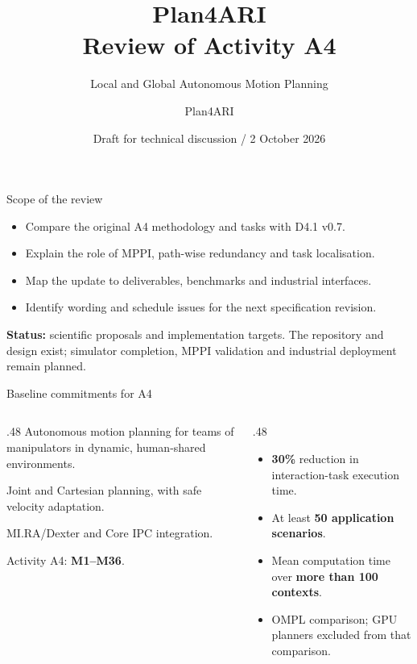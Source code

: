 \documentclass[aspectratio=169,10pt]{beamer}
\title[Plan4ARI / A4 Review]{Plan4ARI\\\large Review of Activity A4}
\subtitle{Local and Global Autonomous Motion Planning}
\author{Plan4ARI}
\institute{Scientific update and proposed technical specification revision}
\date{Draft for technical discussion / 2 October 2026}
\begin{document}
\begin{frame}
\titlepage
\end{frame}

\begin{frame}{Scope of the review}
\begin{itemize}\items
\item Compare the original A4 methodology and tasks with D4.1 v0.7.
\item Explain the role of MPPI, path-wise redundancy and task localisation.
\item Map the update to deliverables, benchmarks and industrial interfaces.
\item Identify wording and schedule issues for the next specification revision.
\end{itemize}
\medskip
\textbf{Status:} scientific proposals and implementation targets. The repository and design exist; simulator completion, MPPI validation and industrial deployment remain planned.
\end{frame}

\begin{frame}{Baseline commitments for A4}
\begin{columns}[T]
\begin{column}{.48\textwidth}
Autonomous motion planning for teams of manipulators in dynamic, human-shared environments.\par\medskip
Joint and Cartesian planning, with safe velocity adaptation.\par\medskip
MI.RA/Dexter and Core IPC integration.\par
Activity A4: \textbf{M1--M36}.
\end{column}
\begin{column}{.48\textwidth}
\begin{itemize}\items
\item \textbf{30\%} reduction in interaction-task execution time.
\item At least \textbf{50 application scenarios}.
\item Mean computation time over \textbf{more than 100 contexts}.
\item OMPL comparison; GPU planners excluded from that comparison.
\end{itemize}
\end{column}
\end{columns}
\end{frame}
\end{document}
